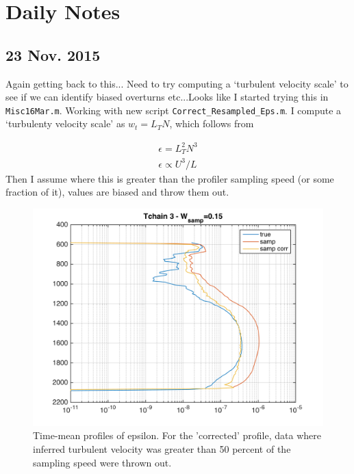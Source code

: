\documentclass[11pt]{article}
\begin{document}
\newpage
\clearpage
\section{Daily Notes}



\clearpage
\newpage
\subsection{23 Nov. 2015}

Again getting back to this... Need to try computing a `turbulent velocity scale' to see if we can identify biased overturns etc...Looks like I started trying this in \verb+Misc16Mar.m+.  Working with new script \verb+Correct_Resampled_Eps.m+. I compute a `turbulenty velocity scale' as $w_t=L_TN$, which follows from

\begin{eqnarray}
\epsilon=L_{T}^{2}N^3 \\
\epsilon \propto U^3/L
\end{eqnarray}
Then I assume where this is greater than the profiler sampling speed (or some fraction of it), values are biased and throw them out.


\begin{figure}[htbp]
\includegraphics[scale=0.8]{Tchain3_Testnum3_Raw_corr_profiles.png}
\caption{Time-mean profiles of epsilon. For the 'corrected' profile, data where inferred turbulent velocity was greater than 50 percent of the sampling speed were thrown out.}
\label{}
\end{figure}
\end{document}
